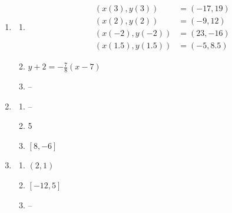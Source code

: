 \documentclass{article}
\begin{document}
\begin{enumerate}
\begin{enumerate}
	\item We can determine her position based on the time.
	
	\item $(-6, 1.5)$
	
	\item $(-4t, 6 - 3t)$
	
	\end{enumerate}
	
\item
	\begin{enumerate}
	
	\item \begin{align*}
		(x(3),y(3)) &= (-17, 19) \\
		(x(2), y(2)) &= (-9, 12) \\
		(x(-2), y(-2)) &= (23, -16) \\
		(x(1.5), y(1.5)) &= (-5, 8.5)
		\end{align*}
		
	\item $y + 2 = -\frac{7}{8}(x - 7)$
	
	\item --
	
	\end{enumerate}
	
\item
	\begin{enumerate}
	
	\item --
	
	\item 5
	
	\item $[8, -6]$
	
	\end{enumerate}
	
\item
	\begin{enumerate}
	
	\item $(2, 1)$
	
	\item $[-12, 5]$
	
	\item --
	

\end{enumerate}
\end{enumerate}
\end{document}
